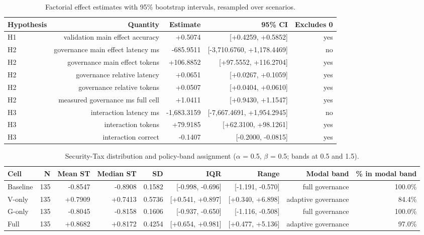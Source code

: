 \begin{table}[htbp]
\centering
\small
\caption{Factorial effect estimates with 95\% bootstrap intervals, resampled over scenarios.}
\label{tab:gmais-5}
\begin{tabular}{lrrrr}
\toprule
Hypothesis & Quantity & Estimate & 95\% CI & Excludes 0 \\
\midrule
H1 & validation main effect accuracy & +0.5074 & [+0.4259, +0.5852] & yes \\
H2 & governance main effect latency ms & -685.9511 & [-3,710.6760, +1,178.4469] & no \\
H2 & governance main effect tokens & +106.8852 & [+97.5552, +116.2704] & yes \\
H2 & governance relative latency & +0.0651 & [+0.0267, +0.1059] & yes \\
H2 & governance relative tokens & +0.0507 & [+0.0404, +0.0610] & yes \\
H2 & measured governance ms full cell & +1.0411 & [+0.9430, +1.1547] & yes \\
H3 & interaction latency ms & -1,683.3159 & [-7,667.4691, +1,954.2945] & no \\
H3 & interaction tokens & +79.9185 & [+62.3100, +98.1261] & yes \\
H3 & interaction correct & -0.1407 & [-0.2000, -0.0815] & yes \\
\bottomrule
\end{tabular}
\end{table}


\begin{table}[htbp]
\centering
\small
\caption{Security-Tax distribution and policy-band assignment ($\alpha$ = 0.5, $\beta$ = 0.5; bands at 0.5 and 1.5).}
\label{tab:gmais-6}
\begin{tabular}{lrrrrrrrr}
\toprule
Cell & N & Mean ST & Median ST & SD & IQR & Range & Modal band & \% in modal band \\
\midrule
Baseline & 135 & -0.8547 & -0.8908 & 0.1582 & [-0.998, -0.696] & [-1.191, -0.570] & full governance & 100.0\% \\
V-only & 135 & +0.7909 & +0.7413 & 0.5736 & [+0.541, +0.897] & [+0.340, +6.898] & adaptive governance & 84.4\% \\
G-only & 135 & -0.8045 & -0.8158 & 0.1606 & [-0.937, -0.650] & [-1.116, -0.508] & full governance & 100.0\% \\
Full & 135 & +0.8682 & +0.8172 & 0.4254 & [+0.654, +0.981] & [+0.477, +5.136] & adaptive governance & 97.0\% \\
\bottomrule
\end{tabular}
\end{table}



